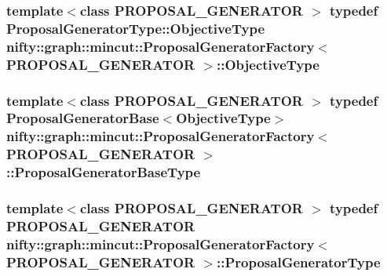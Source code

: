 \subsubsection[{Objective\+Type}]{\setlength{\rightskip}{0pt plus 5cm}template$<$class P\+R\+O\+P\+O\+S\+A\+L\+\_\+\+G\+E\+N\+E\+R\+A\+T\+O\+R $>$ typedef Proposal\+Generator\+Type\+::\+Objective\+Type {\bf nifty\+::graph\+::mincut\+::\+Proposal\+Generator\+Factory}$<$ P\+R\+O\+P\+O\+S\+A\+L\+\_\+\+G\+E\+N\+E\+R\+A\+T\+O\+R $>$\+::{\bf Objective\+Type}}\label{classnifty_1_1graph_1_1mincut_1_1ProposalGeneratorFactory_a67d2d70ce78a84ad0b56b8c061539441}
\hypertarget{classnifty_1_1graph_1_1mincut_1_1ProposalGeneratorFactory_a9f8c1821263e4763208af8639ea46ec8}{}
\subsubsection[{Proposal\+Generator\+Base\+Type}]{\setlength{\rightskip}{0pt plus 5cm}template$<$class P\+R\+O\+P\+O\+S\+A\+L\+\_\+\+G\+E\+N\+E\+R\+A\+T\+O\+R $>$ typedef {\bf Proposal\+Generator\+Base}$<${\bf Objective\+Type}$>$ {\bf nifty\+::graph\+::mincut\+::\+Proposal\+Generator\+Factory}$<$ P\+R\+O\+P\+O\+S\+A\+L\+\_\+\+G\+E\+N\+E\+R\+A\+T\+O\+R $>$\+::{\bf Proposal\+Generator\+Base\+Type}}\label{classnifty_1_1graph_1_1mincut_1_1ProposalGeneratorFactory_a9f8c1821263e4763208af8639ea46ec8}
\hypertarget{classnifty_1_1graph_1_1mincut_1_1ProposalGeneratorFactory_a16477f085cf5ead9222e5e18635cb9b0}{}
\subsubsection[{Proposal\+Generator\+Type}]{\setlength{\rightskip}{0pt plus 5cm}template$<$class P\+R\+O\+P\+O\+S\+A\+L\+\_\+\+G\+E\+N\+E\+R\+A\+T\+O\+R $>$ typedef P\+R\+O\+P\+O\+S\+A\+L\+\_\+\+G\+E\+N\+E\+R\+A\+T\+O\+R {\bf nifty\+::graph\+::mincut\+::\+Proposal\+Generator\+Factory}$<$ P\+R\+O\+P\+O\+S\+A\+L\+\_\+\+G\+E\+N\+E\+R\+A\+T\+O\+R $>$\+::{\bf Proposal\+Generator\+Type}}\label{classnifty_1_1graph_1_1mincut_1_1ProposalGeneratorFactory_a16477f085cf5ead9222e5e18635cb9b0}
\hypertarget{classnifty_1_1graph_1_1mincut_1_1ProposalGeneratorFactory_a7fdfc7569679f720aec5524b1ec1b3e7}{}
